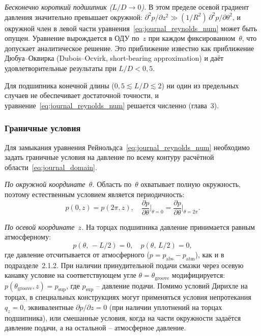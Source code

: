 \textit{Бесконечно короткий подшипник ($L/D \to 0$).} В этом пределе осевой градиент давления значительно превышает окружной: $\partial^2 p/\partial z^2 \gg (1/R^2)\,\partial^2 p/\partial \theta^2$, и окружной член в левой части уравнения~\eqref{eq:journal_reynolds_num} может быть опущен. Уравнение вырождается в ОДУ по~$z$ при каждом фиксированном~$\theta$, что допускает аналитическое решение. Это приближение известно как приближение Дюбуа--Оквирка (Dubois--Ocvirk, short-bearing approximation) и даёт удовлетворительные результаты при $L/D < 0{,}5$.

Для подшипника конечной длины ($0{,}5 \lesssim L/D \lesssim 2$) ни один из предельных случаев не обеспечивает достаточной точности, и уравнение~\eqref{eq:journal_reynolds_num} решается численно (глава~3).


\subsubsection*{Граничные условия}

Для замыкания уравнения Рейнольдса~\eqref{eq:journal_reynolds_num} необходимо задать граничные условия на давление по всему контуру расчётной области~\eqref{eq:journal_domain}.

\textit{По окружной координате~$\theta$.} Область по~$\theta$ охватывает полную окружность, поэтому естественным условием является периодичность:
\begin{equation}
p(0, z) = p(2\pi, z), \quad \frac{\partial p}{\partial \theta}\bigg|_{\theta=0} = \frac{\partial p}{\partial \theta}\bigg|_{\theta=2\pi}.
\label{eq:journal_bc_periodic}
\end{equation}

\textit{По осевой координате~$z$.} На торцах подшипника давление принимается равным атмосферному:
\begin{equation}
p(\theta,\,-L/2) = 0, \quad p(\theta,\,L/2) = 0,
\label{eq:journal_bc_axial}
\end{equation}
где давление отсчитывается от атмосферного ($p = p_{\mathrm{abs}} - p_{\mathrm{atm}}$), как и в подразделе~2.1.2. При наличии принудительной подачи смазки через осевую канавку условие на соответствующем угле $\theta = \theta_{\mathrm{groove}}$ модифицируется: $p(\theta_{\mathrm{groove}}, z) = p_{\mathrm{sup}}$, где $p_{\mathrm{sup}}$ -- давление подачи. Помимо условий Дирихле на торцах, в специальных конструкциях могут применяться условия непротекания $q_z = 0$, эквивалентные $\partial p/\partial z = 0$ (при наличии уплотнений на торцах подшипника), или смешанные условия, когда на части окружности задаётся давление подачи, а на остальной -- атмосферное давление.

